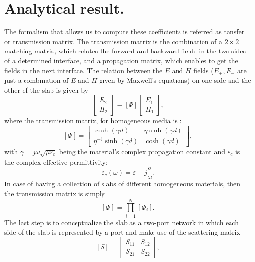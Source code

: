 \documentclass[12pt, oneside]{book}
\begin{document}
\section{Analytical result.}
The formalism that allows us to compute these coefficients is referred as tansfer or transmission matrix. The transmission matrix is the combination of a $2\times 2$ matching matrix, which relates the forward and backward fields in the two sides of a determined interface, and a propagation matrix, which enables to get the fields in the next interface. The relation between the $E$ and $H$ fields ($E_+, E_-$ are just a combination of $E$ and $H$ given by Maxwell's equations) on one side and the other of the slab is given by
\begin{equation}
\left[\begin{array}{c}
E_{2} \\
H_{2}
\end{array}\right]=[\Phi]\left[\begin{array}{l}
E_{1} \\
H_{1}
\end{array}\right],
\end{equation}
where the transmission matrix, for homogeneous media is \cite{orfanidis2002electromagnetic}:
\begin{equation}\label{transmissionmatrix}
[\Phi]=\left[\begin{array}{cc}
\cosh (\gamma d) & \eta \sinh (\gamma d) \\
\eta^{-1} \sinh (\gamma d) & \cosh (\gamma d)
\end{array}\right],
\end{equation}
with $\gamma=j \omega \sqrt{\mu \varepsilon_{c}}$ being the material's complex propagation constant and $\varepsilon_{c}$ is the complex effective permittivity:
\begin{equation}
\varepsilon_{c}(\omega)=\varepsilon-j \frac{\sigma}{\omega}.
\end{equation}
\indent In case of having a collection of slabs of different homogeneous materials, then the transmission matrix is simply
\begin{equation}\label{variosmateriales}
[\Phi]=\prod_{i=1}^{N}\left[\Phi_{i}\right].
\end{equation}
\indent The last step is to conceptualize the slab as a two-port network in which each side of the slab is represented by a port and make use of the scattering matrix  \cite{orfanidis2002electromagnetic}
\begin{equation}\label{scatteringparameters}
[S]=\left[\begin{array}{ll}
S_{11} & S_{12} \\
S_{21} & S_{22}
\end{array}\right],
\end{equation}
\end{document}
